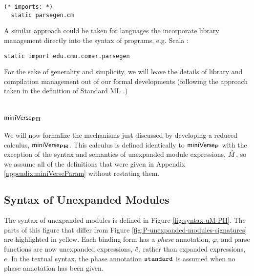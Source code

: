 {\begin{lstlisting}[numbers=none,morekeywords={Library,is}]
  (* imports: *)
  static parsegen.cm 
\end{lstlisting}

A similar approach could be taken for languages the incorporate library management directly into the syntax of programs, e.g. Scala \cite{odersky2008programming}:
\begin{lstlisting}[numbers=none]
static import edu.cmu.comar.parsegen
\end{lstlisting}

For the sake of generality and simplicity, we will leave the details of library and compilation management out of our formal developments (following the approach taken in the definition of Standard ML \cite{Tofte:89:TheDefinitionOfStandardML}.)

\section{\texorpdfstring{$\mathsf{miniVerse}_\textbf{PH}$}{miniVersePH}}
We will now formalize the mechanisms just discussed by developing a reduced calculus, $\mathsf{miniVerse}_\textbf{PH}$. This calculus is defined identically to $\mathsf{miniVerse}_\textbf{P}$ with the exception of the syntax and semantics of unexpanded module expressions, ${\hat M}$, so we assume all of the definitions that were given in Appendix \ref{appendix:miniVerseParam} without restating them. 

\subsection{Syntax of Unexpanded Modules}
The syntax of unexpanded modules is defined in Figure \ref{fig:syntax-uM-PH}. The parts of this figure that differ from Figure \ref{fig:P-unexpanded-modules-signatures} are highlighted in yellow. Each binding form has a \emph{phase} annotation, $\varphi$, and parse functions are now unexpanded expressions, ${\hat e}$, rather than expanded expressions, $e$. In the textual syntax, the phase annotation $\texttt{standard}$ is assumed when no phase annotation has been given.

}
